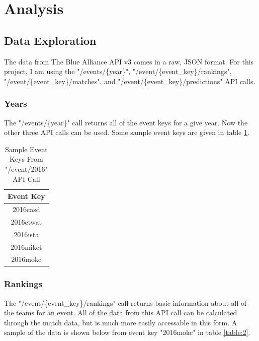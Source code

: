 \documentclass{article}
\begin{document}
\section{Analysis}
\subsection{Data Exploration}
\par
The data from The Blue Alliance API v3 comes in a raw, JSON format. For this project, I am using the "/events/\{year\}", "/event/\{event\_key\}/rankings", "/event/\{event\_key\}/matches", and "/event/\{event\_key\}/predictions" API calls.

\subsubsection{Years}
\par
The "/events/\{year\}" call returns all of the event keys for a give year. Now the other three API calls can be used. Some sample event keys are given in table \ref{table:1}.

\begin{table}[H]
\caption{Sample Event Keys From "/event/2016" API Call}
\centering
\begin{tabular} { |c| }
\hline
Event Key\\
\hline
2016casd\\
\hline
2016ctwat\\
\hline
2016ista\\
\hline
2016miket\\
\hline
2016mokc\\
\hline
\end{tabular}
\label{table:1}
\end{table}

\subsubsection{Rankings}
\par
The "/event/\{event\_key\}/rankings" call returns basic information about all of the teams for an event. All of the data from this API call can be calculated through the match data, but is much more easily accessable in this form. A sample of the data is shown below from event key "2016mokc" in table \ref{table:2}.
\end{document}
